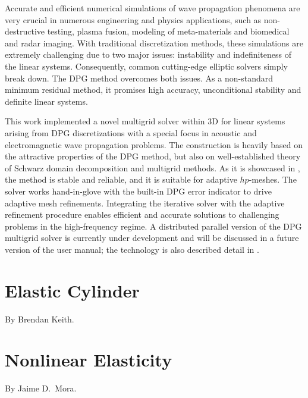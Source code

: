 Accurate and efficient numerical simulations of wave propagation phenomena are very crucial in numerous engineering and physics applications, such as non-destructive testing, plasma fusion, modeling of meta-materials and biomedical and radar imaging. With traditional discretization methods, these simulations are extremely challenging due to two major issues: instability and indefiniteness of the linear systems. Consequently, common cutting-edge elliptic solvers simply break down. The DPG method overcomes both issues. As a non-standard minimum residual method, it promises high accuracy, unconditional stability and definite linear systems.

This work implemented a novel multigrid solver within \hp3D for linear systems arising from DPG discretizations with a special focus in acoustic and electromagnetic wave propagation problems. The construction is heavily based on the attractive properties of the DPG method, but also on well-established theory of Schwarz domain decomposition and multigrid methods. As it is showcased in \cite{petrides2019phd,petrides2021adaptive,petrides2017adaptive}, the method is stable and reliable, and it is suitable for adaptive $hp$-meshes. The solver works hand-in-glove with the built-in DPG error indicator to drive adaptive mesh refinements. Integrating the iterative solver with the adaptive refinement procedure enables efficient and accurate solutions to challenging problems in the high-frequency regime. A distributed parallel version of the DPG multigrid solver is currently under development and will be discussed in a future version of the user manual; the technology is also described detail in \cite{hpbook3}.


\section{Elastic Cylinder}
\label{sec:hose}

By Brendan Keith.

\section{Nonlinear Elasticity}
\label{sec:nonlinear-elasticity}

By Jaime D.~Mora.

